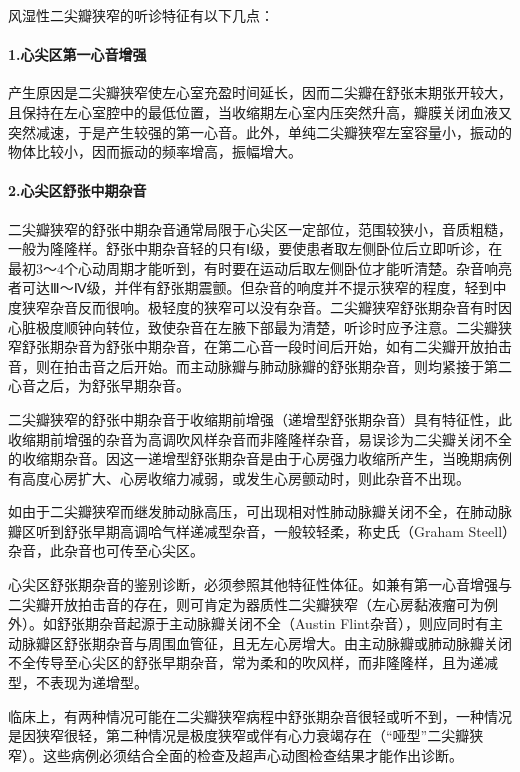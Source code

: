 风湿性二尖瓣狭窄的听诊特征有以下几点：

\paragraph{1.心尖区第一心音增强}

产生原因是二尖瓣狭窄使左心室充盈时间延长，因而二尖瓣在舒张末期张开较大，且保持在左心室腔中的最低位置，当收缩期左心室内压突然升高，瓣膜关闭血液又突然减速，于是产生较强的第一心音。此外，单纯二尖瓣狭窄左室容量小，振动的物体比较小，因而振动的频率增高，振幅增大。

\paragraph{2.心尖区舒张中期杂音}

二尖瓣狭窄的舒张中期杂音通常局限于心尖区一定部位，范围较狭小，音质粗糙，一般为隆隆样。舒张中期杂音轻的只有Ⅰ级，要使患者取左侧卧位后立即听诊，在最初3～4个心动周期才能听到，有时要在运动后取左侧卧位才能听清楚。杂音响亮者可达Ⅲ～Ⅳ级，并伴有舒张期震颤。但杂音的响度并不提示狭窄的程度，轻到中度狭窄杂音反而很响。极轻度的狭窄可以没有杂音。二尖瓣狭窄舒张期杂音有时因心脏极度顺钟向转位，致使杂音在左腋下部最为清楚，听诊时应予注意。二尖瓣狭窄舒张期杂音为舒张中期杂音，在第二心音一段时间后开始，如有二尖瓣开放拍击音，则在拍击音之后开始。而主动脉瓣与肺动脉瓣的舒张期杂音，则均紧接于第二心音之后，为舒张早期杂音。

二尖瓣狭窄的舒张中期杂音于收缩期前增强（递增型舒张期杂音）具有特征性，此收缩期前增强的杂音为高调吹风样杂音而非隆隆样杂音，易误诊为二尖瓣关闭不全的收缩期杂音。因这一递增型舒张期杂音是由于心房强力收缩所产生，当晚期病例有高度心房扩大、心房收缩力减弱，或发生心房颤动时，则此杂音不出现。

如由于二尖瓣狭窄而继发肺动脉高压，可出现相对性肺动脉瓣关闭不全，在肺动脉瓣区听到舒张早期高调哈气样递减型杂音，一般较轻柔，称史氏（Graham
Steell）杂音，此杂音也可传至心尖区。

心尖区舒张期杂音的鉴别诊断，必须参照其他特征性体征。如兼有第一心音增强与二尖瓣开放拍击音的存在，则可肯定为器质性二尖瓣狭窄（左心房黏液瘤可为例外）。如舒张期杂音起源于主动脉瓣关闭不全（Austin
Flint杂音），则应同时有主动脉瓣区舒张期杂音与周围血管征，且无左心房增大。由主动脉瓣或肺动脉瓣关闭不全传导至心尖区的舒张早期杂音，常为柔和的吹风样，而非隆隆样，且为递减型，不表现为递增型。

临床上，有两种情况可能在二尖瓣狭窄病程中舒张期杂音很轻或听不到，一种情况是因狭窄很轻，第二种情况是极度狭窄或伴有心力衰竭存在（“哑型”二尖瓣狭窄）。这些病例必须结合全面的检查及超声心动图检查结果才能作出诊断。

